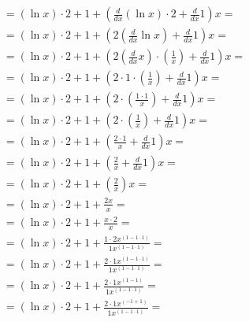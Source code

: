 \documentclass{article}
\begin{document}
\begin{gather*}
={{{\left(\ln{{x}}\right)}{\cdot}{2}}+{{1}+{{\left({{\frac{{d}}{{d{{x}}}}}{{{\left(\ln{{x}}\right)}{\cdot}{2}}}}+{{\frac{{d}}{{d{{x}}}}}{{1}}}\right)}{x}}}}=\\
={{{\left(\ln{{x}}\right)}{\cdot}{2}}+{{1}+{{\left({{2}{\left({\frac{{d}}{{d{{x}}}}}{{\ln{{x}}}}\right)}}+{{\frac{{d}}{{d{{x}}}}}{{1}}}\right)}{x}}}}=\\
={{{\left(\ln{{x}}\right)}{\cdot}{2}}+{{1}+{{\left({{2}{{\left({\frac{{d}}{{d{{x}}}}}{{x}}\right)}{\cdot}{\left(\frac{{1}}{{x}}\right)}}}+{{\frac{{d}}{{d{{x}}}}}{{1}}}\right)}{x}}}}=\\
={{{\left(\ln{{x}}\right)}{\cdot}{2}}+{{1}+{{\left({{2}{\cdot}{{1}{\cdot}{\left(\frac{{1}}{{x}}\right)}}}+{{\frac{{d}}{{d{{x}}}}}{{1}}}\right)}{x}}}}=\\
={{{\left(\ln{{x}}\right)}{\cdot}{2}}+{{1}+{{\left({{2}{\cdot}{\left(\frac{{{1}{\cdot}{1}}}{{x}}\right)}}+{{\frac{{d}}{{d{{x}}}}}{{1}}}\right)}{x}}}}=\\
={{{\left(\ln{{x}}\right)}{\cdot}{2}}+{{1}+{{\left({{2}{\cdot}{\left(\frac{{1}}{{x}}\right)}}+{{\frac{{d}}{{d{{x}}}}}{{1}}}\right)}{x}}}}=\\
={{{\left(\ln{{x}}\right)}{\cdot}{2}}+{{1}+{{\left({\frac{{{2}{\cdot}{1}}}{{x}}}+{{\frac{{d}}{{d{{x}}}}}{{1}}}\right)}{x}}}}=\\
={{{\left(\ln{{x}}\right)}{\cdot}{2}}+{{1}+{{\left({\frac{{2}}{{x}}}+{{\frac{{d}}{{d{{x}}}}}{{1}}}\right)}{x}}}}=\\
={{{\left(\ln{{x}}\right)}{\cdot}{2}}+{{1}+{{\left(\frac{{2}}{{x}}\right)}{x}}}}=\\
={{{\left(\ln{{x}}\right)}{\cdot}{2}}+{{1}+{\frac{{{2}{x}}}{{x}}}}}=\\
={{{\left(\ln{{x}}\right)}{\cdot}{2}}+{{1}+{\frac{{{x}{\cdot}{2}}}{{x}}}}}=\\
={{{\left(\ln{{x}}\right)}{\cdot}{2}}+{{1}+{\frac{{{{1}{\cdot}{2}}{{x}^{\left({1}-{{1}{\cdot}{1}}\right)}}}}{{{1}{{x}^{\left({1}-{{1}{\cdot}{1}}\right)}}}}}}}=\\
={{{\left(\ln{{x}}\right)}{\cdot}{2}}+{{1}+{\frac{{{2}{\cdot}{{1}{{x}^{\left({1}-{{1}{\cdot}{1}}\right)}}}}}{{{1}{{x}^{\left({1}-{{1}{\cdot}{1}}\right)}}}}}}}=\\
={{{\left(\ln{{x}}\right)}{\cdot}{2}}+{{1}+{\frac{{{2}{\cdot}{{1}{{x}^{\left({1}-{1}\right)}}}}}{{{1}{{x}^{\left({1}-{{1}{\cdot}{1}}\right)}}}}}}}=\\
={{{\left(\ln{{x}}\right)}{\cdot}{2}}+{{1}+{\frac{{{2}{\cdot}{{1}{{x}^{\left({-{1}}+{1}\right)}}}}}{{{1}{{x}^{\left({1}-{{1}{\cdot}{1}}\right)}}}}}}}=\\

\end{gather*}
\end{document}
